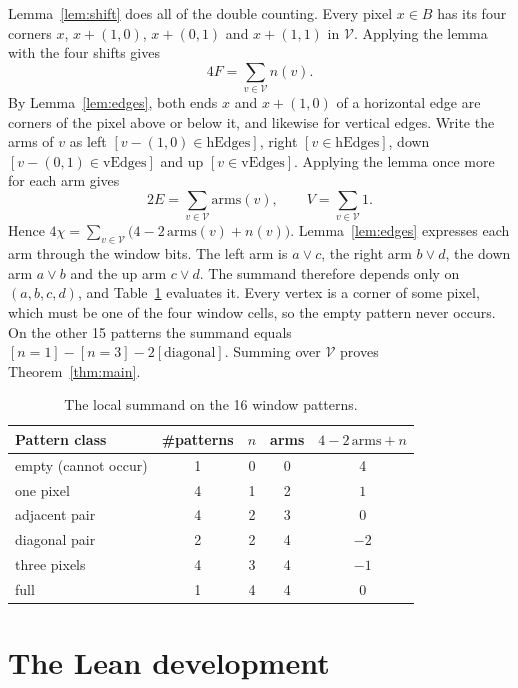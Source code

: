 \documentclass[11pt]{article}
\theoremstyle{definition}
\theoremstyle{remark}
\begin{document}
Lemma~\ref{lem:shift} does all of the double counting. Every pixel $x\in B$
has its four corners $x$, $x+(1,0)$, $x+(0,1)$ and $x+(1,1)$ in $\mathcal V$.
Applying the lemma with the four shifts gives
\[
  4F = \sum_{v\in\mathcal V} n(v).
\]
By Lemma~\ref{lem:edges}, both ends $x$ and $x+(1,0)$ of a horizontal edge are
corners of the pixel above or below it, and likewise for vertical edges.
Write the arms of $v$ as left $[v-(1,0)\in\mathrm{hEdges}]$, right
$[v\in\mathrm{hEdges}]$, down $[v-(0,1)\in\mathrm{vEdges}]$ and up
$[v\in\mathrm{vEdges}]$. Applying the lemma once more for each arm gives
\[
  2E = \sum_{v\in\mathcal V}\mathrm{arms}(v), \qquad V=\sum_{v\in\mathcal V}1 .
\]
Hence $4\chi = \sum_{v\in\mathcal V}\bigl(4-2\,\mathrm{arms}(v)+n(v)\bigr)$.
Lemma~\ref{lem:edges} expresses each arm through the window bits. The left arm
is $a\lor c$, the right arm $b\lor d$, the down arm $a\lor b$ and the up arm
$c\lor d$. The summand therefore depends only on $(a,b,c,d)$, and
Table~\ref{tab:patterns} evaluates it. Every vertex is a corner of some pixel,
which must be one of the four window cells, so the empty pattern never occurs.
On the other 15 patterns the summand equals
$[n=1]-[n=3]-2[\text{diagonal}]$. Summing over $\mathcal V$ proves
Theorem~\ref{thm:main}.

\begin{table}[h]
\centering
\begin{tabular}{lcccc}
\toprule
Pattern class & \#patterns & $n$ & arms & $4-2\,\mathrm{arms}+n$\\
\midrule
empty (cannot occur) & 1 & 0 & 0 & 4\\
one pixel & 4 & 1 & 2 & $1$\\
adjacent pair & 4 & 2 & 3 & $0$\\
diagonal pair & 2 & 2 & 4 & $-2$\\
three pixels & 4 & 3 & 4 & $-1$\\
full & 1 & 4 & 4 & $0$\\
\bottomrule
\end{tabular}
\caption{The local summand on the 16 window patterns.}
\label{tab:patterns}
\end{table}

\section{The Lean development}
\end{document}
